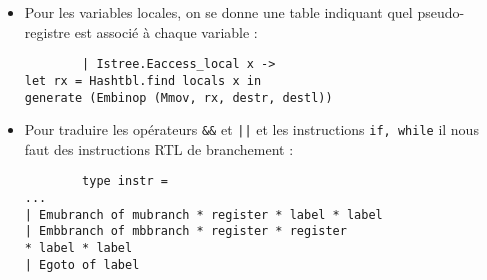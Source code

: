 \documentclass{cours}
\begin{document}
\begin{itemize}
    \item Pour les variables locales, on se donne une table indiquant quel pseudo-registre est associé à chaque variable : 
    \begin{verbatim}
        | Istree.Eaccess_local x ->
let rx = Hashtbl.find locals x in
generate (Embinop (Mmov, rx, destr, destl))
    \end{verbatim}
    \item Pour traduire les opérateurs \texttt{\&\&} et \texttt{||} et les instructions \texttt{if, while} il nous faut des instructions RTL de branchement : 
    \begin{verbatim}
        type instr =
...
| Emubranch of mubranch * register * label * label
| Embbranch of mbbranch * register * register
* label * label
| Egoto of label


\end{verbatim}
\end{itemize}
\end{document}
